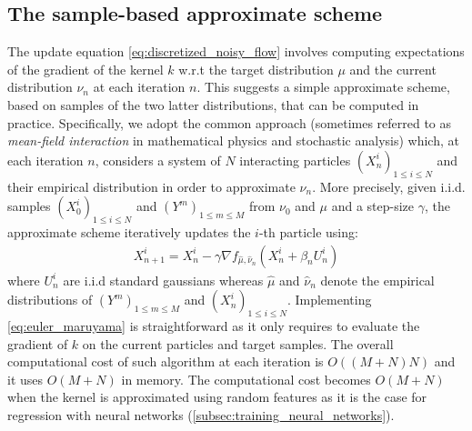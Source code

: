 
\subsection{The sample-based approximate scheme}\label{sec:sample_based}

The update equation \eqref{eq:discretized_noisy_flow} involves computing expectations of the gradient of the kernel $k$ w.r.t the target distribution $\mu$ and the current distribution $\nu_n$ at each iteration $n$. This suggests a simple approximate scheme, based on samples of the two latter distributions, that can be computed in practice. Specifically, we adopt the common approach (sometimes referred to as \textit{mean-field interaction} in mathematical physics and stochastic analysis) which, at each iteration $n$, considers a system of $N$ interacting particles $(X_n^i)_{1\leq i\leq N}$  and their empirical distribution in order to approximate $\nu_n$. 
More precisely, given i.i.d. samples $(X^i_0)_{1\leq i\leq N}$ and $(Y^{m})_{1\leq m\leq M}$ from $\nu_0$ and $\mu$ and a step-size $\gamma$, the approximate scheme iteratively updates the $i$-th particle using: 
\begin{align}\label{eq:euler_maruyama}
X_{n+1}^{i} = X_n^i -\gamma \nabla f_{\hat{\mu},\hat{\nu}_n}(X_n^i+\beta_n U_n^i)
\end{align}
where $U_{n}^{i}$ are i.i.d standard gaussians whereas $\hat{\mu}$ and $\hat{\nu}_n$ denote the empirical distributions of $(Y^{m})_{1\leq m\leq M}$ and $(X^i_n)_{1\leq i\leq N}$. %
Implementing \cref{eq:euler_maruyama} is straightforward as it only requires to evaluate the gradient of $k$ on the current particles and target samples.
The overall computational cost of such algorithm at each iteration is $O((M+N)N)$ and it uses $O(M+N)$ in memory. The computational cost becomes  $O(M+N)$ when the kernel is approximated using random features as it is the case for regression with neural networks (\cref{subsec:training_neural_networks}). 
